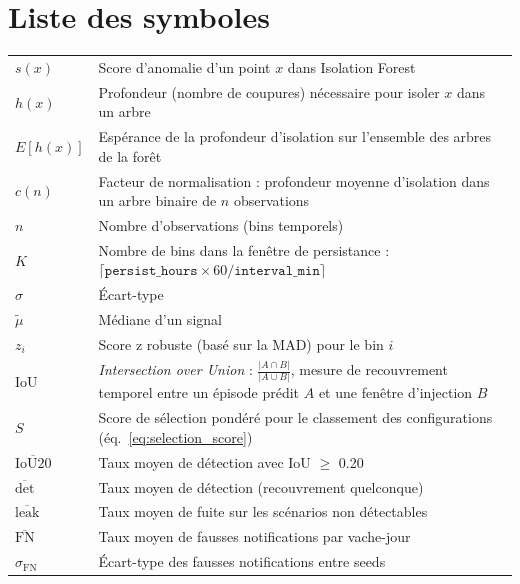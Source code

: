 \chapter*{Liste des symboles}

\begin{tabular}{@{}lp{14cm}@{}}
$s(x)$               & Score d'anomalie d'un point $x$ dans Isolation Forest \\[3pt]
$h(x)$               & Profondeur (nombre de coupures) nécessaire pour isoler $x$
                        dans un arbre \\[3pt]
$E[h(x)]$            & Espérance de la profondeur d'isolation sur l'ensemble des
                        arbres de la forêt \\[3pt]
$c(n)$               & Facteur de normalisation : profondeur moyenne d'isolation
                        dans un arbre binaire de $n$ observations \\[3pt]
$n$                   & Nombre d'observations (bins temporels) \\[3pt]
$K$                   & Nombre de bins dans la fenêtre de persistance :
                        $\lceil \texttt{persist\_hours} \times 60 /
                        \texttt{interval\_min} \rceil$ \\[3pt]
$\sigma$              & Écart-type \\[3pt]
$\tilde{\mu}$         & Médiane d'un signal \\[3pt]
$z_i$                 & Score z robuste (basé sur la MAD) pour le bin $i$ \\[3pt]
$\text{IoU}$          & \textit{Intersection over Union} :
                        $\frac{|A \cap B|}{|A \cup B|}$, mesure de recouvrement
                        temporel entre un épisode prédit $A$ et une fenêtre
                        d'injection $B$ \\[3pt]
$S$                   & Score de sélection pondéré pour le classement des
                        configurations (éq.~\ref{eq:selection_score}) \\[3pt]
$\overline{\text{IoU20}}$ & Taux moyen de détection avec IoU $\geq$ 0.20 \\[3pt]
$\overline{\text{det}}$   & Taux moyen de détection (recouvrement quelconque) \\[3pt]
$\overline{\text{leak}}$  & Taux moyen de fuite sur les scénarios non détectables \\[3pt]
$\overline{\text{FN}}$    & Taux moyen de fausses notifications par vache-jour \\[3pt]
$\sigma_{\text{FN}}$      & Écart-type des fausses notifications entre seeds \\[3pt]
\end{tabular}
